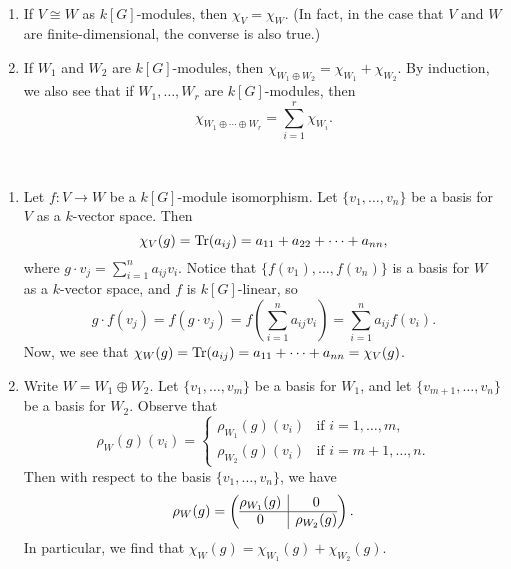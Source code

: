 \begin{remark}~
    \begin{enumerate}[(1)]
        \item If $V \cong W$ as $k[G]$-modules, then $\chi_V = \chi_W$. 
        (In fact, in the case that $V$ and $W$ are finite-dimensional, the 
        converse is also true.)
        \item If $W_1$ and $W_2$ are $k[G]$-modules, then 
        $\chi_{W_1\oplus W_2} = \chi_{W_1} + \chi_{W_2}$. By induction, we 
        also see that if $W_1, \dots, W_r$ are $k[G]$-modules, then 
        \[ \chi_{W_1 \oplus \cdots \oplus W_r} = \sum_{i=1}^r \chi_{W_i}. \] 
    \end{enumerate}
\end{remark}
\begin{pf}~
    \begin{enumerate}[(1)]
        \item Let $f : V \to W$ be a $k[G]$-module isomorphism. Let 
        $\{v_1, \dots, v_n\}$ be a basis for $V$ as a $k$-vector space. Then 
        \[ \chi_V(g) = \operatorname{Tr}(a_{ij}) = a_{11} + a_{22} + \cdots + a_{nn}, \] 
        where $g \cdot v_j = \sum_{i=1}^n a_{ij} v_i$. Notice that 
        $\{f(v_1), \dots, f(v_n)\}$ is a basis for $W$ as a $k$-vector space, 
        and $f$ is $k[G]$-linear, so 
        \[ g \cdot f(v_j) = f(g \cdot v_j) = f \left( \sum_{i=1}^n 
        a_{ij} v_i \right) = \sum_{i=1}^n a_{ij} f(v_i). \] 
        Now, we see that $\chi_W(g) = \operatorname{Tr}(a_{ij}) = a_{11} + \cdots + a_{nn} 
        = \chi_V(g)$. 
        \item Write $W = W_1 \oplus W_2$. Let $\{v_1, \dots, v_m\}$ be a basis 
        for $W_1$, and let $\{v_{m+1}, \dots, v_n\}$ be a basis for $W_2$. 
        Observe that 
        \[ \rho_W(g)(v_i) = \begin{cases} \rho_{W_1}(g)(v_i) & \text{if } 
            i = 1, \dots, m, \\ \rho_{W_2}(g)(v_i) & \text{if } i = 
            m+1, \dots, n. \end{cases} \] 
        Then with respect to the basis $\{v_1, \dots, v_n\}$, we have 
        \[ \rho_W(g) = \left(\begin{array}{@{}c|c@{}}
            \rho_{W_1}(g) & 0 \\\hline
            0 & \rho_{W_2}(g)
          \end{array}\right). \]
        In particular, we find that $\chi_W(g) = \chi_{W_1}(g) + \chi_{W_2}(g)$. 
        \qedhere 
    \end{enumerate}
\end{pf}

